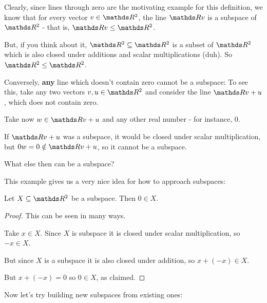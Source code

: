 \begin{ex}
	Clearly, since lines through zero are the motivating example for this definition, we know that for every vector $v\in \R^2$, the line $\R v$ is a subspace of $\R^2$ - that is, $\R v\leq \R^2$.
	
	But, if you think about it, $\R^2\subseteq \R^2$ is a subset of $\R^2$ which is also closed under additions and scalar multiplications (duh). So $\R^2\leq \R^2$.
	
	\bigskip
	Conversely, \textbf{any} line which doesn't contain zero cannot be a subspace: To see this, take any two vectors $v,u\in \R^2$ and consider the line $\R v+u$, which does not contain zero.
	
	Take now $w\in \R v+u$ and any other real number - for instance, 0.
	
	If $\R v+u$ was a subspace, it would be closed under scalar multiplication, but $0w=0\notin\R v+u$, so it cannot be a subspace.
	
	\bigskip
	What else then can be a subspace?
\end{ex}
This example gives us a very nice idea for how to approach subspaces:
\begin{prop}
	Let $X\subseteq \R^2$ be a subspace. Then $0\in X$.
\end{prop}
\begin{proof}
	This can be seen in many ways.
	
	Take $x\in X$. Since $X$ is subspace it is closed under scalar multiplication, so $-x\in X$.
	
	But since $X$ is a subspace it is also closed under addition, so $x+(-x)\in X$.
	
	But $x+(-x)=0$ so $0\in X$, as claimed.
\end{proof}

Now let's try building new subspaces from existing ones:

